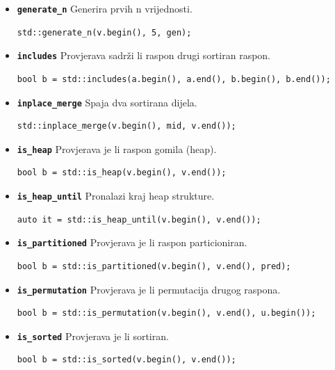 \begin{itemize}
\item \textbf{\texttt{generate\_n}}\newline
Generira prvih n vrijednosti.
\begin{verbatim}
std::generate_n(v.begin(), 5, gen);
\end{verbatim}

\item \textbf{\texttt{includes}}\newline
Provjerava sadrži li raspon drugi sortiran raspon.
\begin{verbatim}
bool b = std::includes(a.begin(), a.end(), b.begin(), b.end());
\end{verbatim}

\item \textbf{\texttt{inplace\_merge}}\newline
Spaja dva sortirana dijela.
\begin{verbatim}
std::inplace_merge(v.begin(), mid, v.end());
\end{verbatim}

\item \textbf{\texttt{is\_heap}}\newline
Provjerava je li raspon gomila (heap).
\begin{verbatim}
bool b = std::is_heap(v.begin(), v.end());
\end{verbatim}

\item \textbf{\texttt{is\_heap\_until}}\newline
Pronalazi kraj heap strukture.
\begin{verbatim}
auto it = std::is_heap_until(v.begin(), v.end());
\end{verbatim}

\item \textbf{\texttt{is\_partitioned}}\newline
Provjerava je li raspon particioniran.
\begin{verbatim}
bool b = std::is_partitioned(v.begin(), v.end(), pred);
\end{verbatim}

\item \textbf{\texttt{is\_permutation}}\newline
Provjerava je li permutacija drugog raspona.
\begin{verbatim}
bool b = std::is_permutation(v.begin(), v.end(), u.begin());
\end{verbatim}

\item \textbf{\texttt{is\_sorted}}\newline
Provjerava je li sortiran.
\begin{verbatim}
bool b = std::is_sorted(v.begin(), v.end());
\end{verbatim}


\end{itemize}
